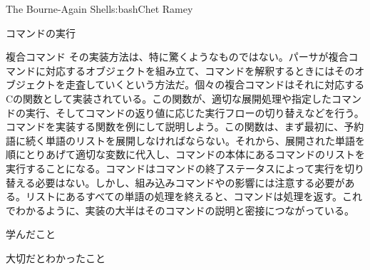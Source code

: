 \begin{aosachapter}{The Bourne-Again Shell}{s:bash}{Chet Ramey}
\begin{aosasect1}{コマンドの実行}
\begin{aosasect2}{複合コマンド}
その実装方法は、特に驚くようなものではない。パーサが複合コマンドに対応するオブジェクトを組み立て、コマンドを解釈するときにはそのオブジェクトを走査していくという方法だ。個々の複合コマンドはそれに対応するCの関数として実装されている。この関数が、適切な展開処理や指定したコマンドの実行、そしてコマンドの返り値に応じた実行フローの切り替えなどを行う。コマンドを実装する関数を例にして説明しよう。この関数は、まず最初に、予約語に続く単語のリストを展開しなければならない。それから、展開された単語を順にとりあげて適切な変数に代入し、コマンドの本体にあるコマンドのリストを実行することになる。コマンドはコマンドの終了ステータスによって実行を切り替える必要はない。しかし、組み込みコマンドやの影響には注意する必要がある。リストにあるすべての単語の処理を終えると、コマンドは処理を返す。これでわかるように、実装の大半はそのコマンドの説明と密接につながっている。

\end{aosasect2}

\end{aosasect1}

\begin{aosasect1}{学んだこと}

\begin{aosasect2}{大切だとわかったこと}


\end{aosasect2}
\end{aosasect1}
\end{aosachapter}
